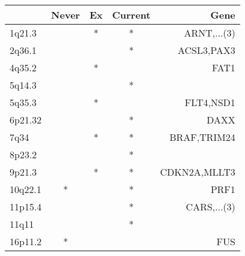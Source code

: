 \begin{tabular}{lcccr}
\toprule
{} & Never & Ex & Current &          Gene \\
\midrule
1q21.3  &       &  * &       * &   ARNT,...(3) \\
2q36.1  &       &    &       * &    ACSL3,PAX3 \\
4q35.2  &       &  * &         &          FAT1 \\
5q14.3  &       &    &       * &               \\
5q35.3  &       &  * &         &     FLT4,NSD1 \\
6p21.32 &       &    &       * &          DAXX \\
7q34    &       &  * &       * &   BRAF,TRIM24 \\
8p23.2  &       &    &       * &               \\
9p21.3  &       &  * &       * &  CDKN2A,MLLT3 \\
10q22.1 &     * &    &       * &          PRF1 \\
11p15.4 &       &    &       * &   CARS,...(3) \\
11q11   &       &    &       * &               \\
16p11.2 &     * &    &         &           FUS \\
\bottomrule
\end{tabular}
